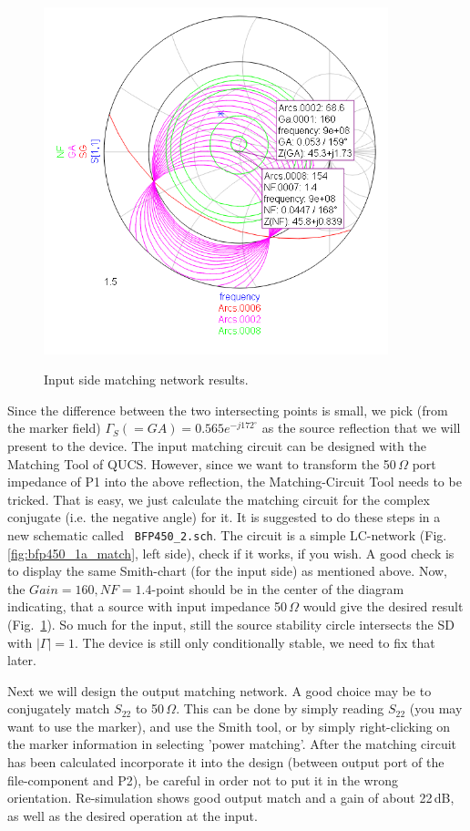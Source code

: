 \begin{figure}
  \centering
  {\includegraphics[width=10cm]{bfp450_1a_match_result.png}}
  \caption{Input side matching network results.}
  \label{fig:bfp450_1a_match_result}
\end{figure}


Since the difference between the two intersecting points is small, we
pick (from the marker field) $\Gamma_S(=GA)=0.565e^{-j172^\circ}$ as
the source reflection that we will present to the device. The input
matching circuit can be designed with the Matching Tool of
QUCS. However, since we want to transform the 50\,$\Omega$ port
impedance of P1 into the above reflection, the Matching-Circuit Tool
needs to be tricked. That is easy, we just calculate the matching
circuit for the complex conjugate (i.e. the negative angle) for it. It
is suggested to do these steps in a new schematic called {\tt
  BFP450\_2.sch}. The circuit is a simple LC-network
(Fig.\ref{fig:bfp450_1a_match}, left side), check if it works, if you
wish. A good check is to display the same Smith-chart (for the input
side) as mentioned above. Now, the $Gain=160,NF=1.4$-point should be
in the center of the diagram indicating, that a source with input
impedance 50\,$\Omega$ would give the desired result
(Fig.~\ref{fig:bfp450_1a_match_result}). So much for the input, still
the source stability circle intersects the SD with $|\Gamma|=1$. The
device is still only conditionally stable, we need to fix that later.

Next we will design the output matching network. A good choice may be
to conjugately match $S_{22}$ to 50\,$\Omega$. This can be done by
simply reading $S_{22}$ (you may want to use the marker), and use the
Smith tool, or by simply right-clicking on the marker information in
selecting 'power matching'. After the matching circuit has been
calculated incorporate it into the design (between output port of the
file-component and P2), be careful in order not to put it in the
wrong orientation. Re-simulation shows good output match and a gain of
about 22\,dB, as well as the desired operation at the input. 


